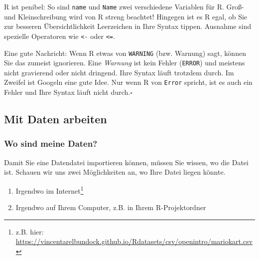 \documentclass[
  letterpaper,
  DIV=11,
  numbers=noendperiod]{scrartcl}
\providecommand{\tightlist}{%
  \setlength{\itemsep}{0pt}\setlength{\parskip}{0pt}}\usepackage{longtable,booktabs,array}
\theoremstyle{definition}
\theoremstyle{definition}
\theoremstyle{definition}
\theoremstyle{remark}
\begin{document}
\begin{tcolorbox}[enhanced jigsaw, coltitle=black, colframe=quarto-callout-caution-color-frame, opacityback=0, toprule=.15mm, opacitybacktitle=0.6, arc=.35mm, titlerule=0mm, toptitle=1mm, title=\textcolor{quarto-callout-caution-color}{\faFire}\hspace{0.5em}{Caution}, bottomtitle=1mm, leftrule=.75mm, breakable, rightrule=.15mm, colbacktitle=quarto-callout-caution-color!10!white, bottomrule=.15mm, colback=white, left=2mm]

R ist penibel: So sind \texttt{name} und \texttt{Name} zwei verschiedene
Variablen für R. Groß- und Kleinschreibung wird von R streng beachtet!
Hingegen ist es R egal, ob Sie zur besseren Übersichtlichkeit
Leerzeichen in Ihre Syntax tippen. Ausnahme sind spezielle Operatoren
wie \texttt{\textless{}-} oder \texttt{\textless{}=}.

Eine gute Nachricht: Wenn R etwas von \texttt{WARNING} (bzw. Warnung)
sagt, können Sie das zumeist ignorieren. Eine \emph{Warnung} ist kein
Fehler (\texttt{ERROR}) und meistens nicht gravierend oder nicht
dringend. Ihre Syntax läuft trotzdem durch. Im Zweifel ist Googeln eine
gute Idee. Nur wenn R von \texttt{Error} spricht, ist es auch ein Fehler
und Ihre Syntax läuft nicht durch.\(\square\)

\end{tcolorbox}

\subsection{Mit Daten arbeiten}\label{mit-daten-arbeiten}

\subsubsection{Wo sind meine Daten?}\label{wo-sind-meine-daten}

Damit Sie eine Datendatei importieren können, müssen Sie wissen, wo die
Datei ist. Schauen wir uns zwei Möglichkeiten an, wo Ihre Datei liegen
könnte.

\begin{enumerate}
\def\labelenumi{\arabic{enumi}.}
\tightlist
\item
  Irgendwo im Internet\footnote{z.B. hier:
    \url{https://vincentarelbundock.github.io/Rdatasets/csv/openintro/mariokart.csv}}
\item
  Irgendwo auf Ihrem Computer, z.B. in Ihrem R-Projektordner
\end{enumerate}
\end{document}
